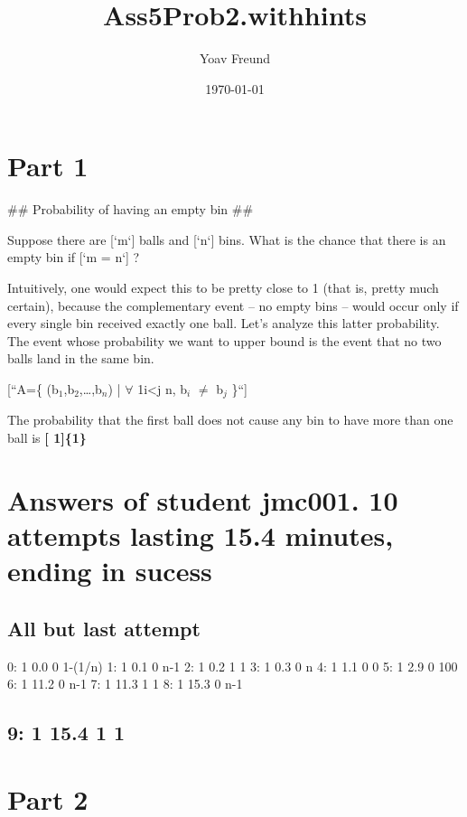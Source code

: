 \documentclass[11pt]{article}
\title{Ass5Prob2.withhints}
\author{Yoav Freund}
\date{\today}
\begin{document}
\maketitle

\setcounter{tocdepth}{3}
\tableofcontents
\vspace*{1cm}
\section{Part   1}
\label{sec-1}


\#\# Probability of having an empty bin \#\#

Suppose there are [`m`] balls and [`n`] bins. What is the chance that there is an empty bin if [`m = n`] ?

Intuitively, one would expect this to be pretty close to 1 (that is, pretty much certain), because the complementary event -- no empty bins -- would occur only if every single bin received exactly one ball. Let's analyze this latter probability. The event whose probability we want to upper bound is the event that no two balls land in the same bin.

[``A=\left\{ (b$_1$,b$_2$,\ldots,b$_n$) | $\forall$ 1\leq i<j \leq n, b$_i$ $\neq$ b$_j$ \right\}``]

The probability that the first ball does not cause any bin to have more than one ball is \textbf{[  1]\{1\}}
\section{Answers of student jmc001. 10 attempts lasting 15.4 minutes, ending in sucess}
\label{sec-2}
\subsection{All but last attempt}
\label{sec-2-1}

  0:      1      0.0    0       1-(1/n)
  1:      1      0.1    0       n-1
  2:      1      0.2    1       1
  3:      1      0.3    0       n
  4:      1      1.1    0       0
  5:      1      2.9    0       100
  6:      1     11.2    0       n-1
  7:      1     11.3    1       1
  8:      1     15.3    0       n-1
\subsection{9:   1     15.4    1       1}
\label{sec-2-2}
\section{Part   2}
\label{sec-3}
\end{document}
